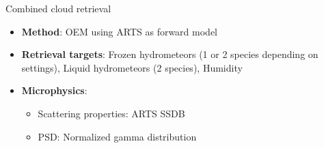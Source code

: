 \documentclass[final,hyperref={pdfpagelabels=false}]{beamer}
\begin{document}
\begin{frame}
\begin{columns}[t]
\begin{column}{.48\linewidth}
        \vspace{-2cm}
        \begin{block}{Combined cloud retrieval}

          \begin{itemize}
          \item \textbf{Method}: OEM using ARTS  \citep{arts} as forward model
          \item \textbf{Retrieval targets}: Frozen hydrometeors (1 or 2 species
            depending on settings), Liquid hydrometeors (2 species), Humidity
          \item \textbf{Microphysics}:
           \begin{itemize}
             \item Scattering properties:  ARTS SSDB \citep{arts_ssdb}
             \item PSD: Normalized gamma distribution \citep{delanoe}
           \end{itemize}
          \end{itemize}\\[1cm]


\end{block}
\end{column}
\end{columns}
\end{frame}
\end{document}

